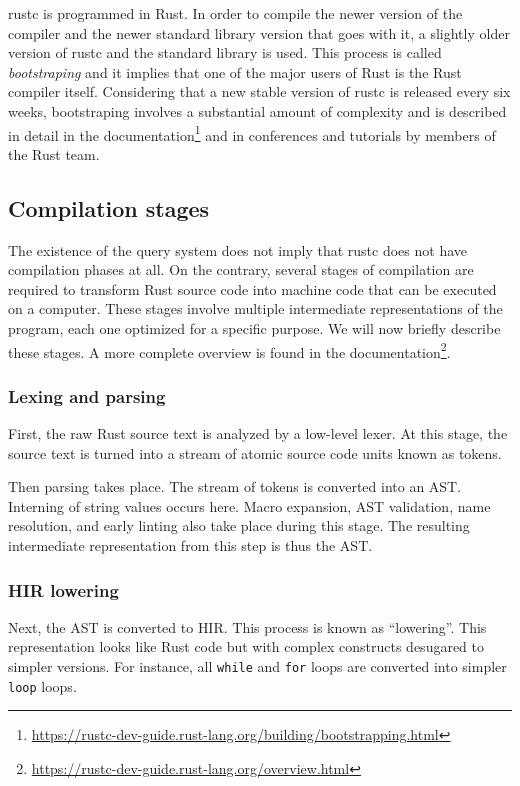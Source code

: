 \documentclass[../Thesis.tex]{subfiles}
\begin{document}
rustc is programmed in Rust.
In order to compile the newer version of the compiler
and the newer standard library version that goes with it,
a slightly older version of rustc and the standard library is used.
This process is called \emph{bootstraping} and it implies
that one of the major users of Rust is the Rust compiler itself.
Considering that a new stable version of rustc is released every six weeks,
bootstraping involves a substantial amount of complexity and is described
in detail in the documentation\footnote{\url{https://rustc-dev-guide.rust-lang.org/building/bootstrapping.html}}
and in conferences \cite{nelson2022} and tutorials \cite{klock2022} by members of the Rust team.

\subsection{Compilation stages}

The existence of the query system does not imply
that rustc does not have compilation phases at all.
On the contrary, several stages of compilation are required
to transform Rust source code into machine code that can be executed on a computer.
These stages involve multiple intermediate representations of the program,
each one optimized for a specific purpose.
We will now briefly describe these stages.
A more complete overview is found
in the documentation\footnote{\url{https://rustc-dev-guide.rust-lang.org/overview.html}}.

\subsubsection{Lexing and parsing}

First, the raw Rust source text is analyzed by a low-level lexer.
At this stage, the source text is turned
into a stream of atomic source code units known as tokens.

Then parsing takes place.
The stream of tokens is converted into an AST.
Interning of string values occurs here.
Macro expansion, AST validation, name resolution,
and early linting also take place during this stage.
The resulting intermediate representation from this step is thus the AST.

\subsubsection{HIR lowering}

Next, the AST is converted to \acrfull{HIR}.
This process is known as ``lowering''.
This representation looks like Rust code but with complex constructs desugared
to simpler versions.
For instance, all \texttt{while} and \texttt{for} loops are converted into simpler
\texttt{loop} loops.
\end{document}
